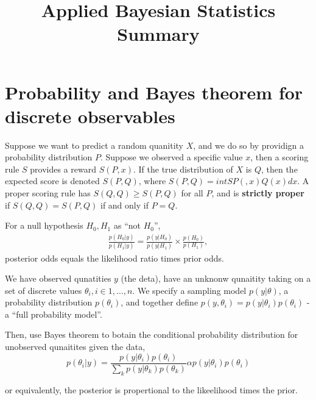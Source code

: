 

\title{Applied Bayesian Statistics Summary}



\maketitle

\section{Probability and Bayes theorem for discrete observables}
\label{sec:prob-bayes-theorobservables}

\begin{defn}
  \label{sec:prob-bayes-theor-1}
  Suppose we want to predict a random quanitity $X$, and we do so by
  providign a probability distribution $P$.  Suppose we observed a
  specific value $x$, then a scoring rule $S$ provides a reward $S(P,
  x)$.  If the true distribution of $X$ is $Q$, then the expected
  score is denoted $S(P, Q)$, where $S(P, Q) = int SP(, x) Q(x) dx$.
  A proper scoring rule has $S(Q, Q) \geq S(P, Q)$ for all $P$, and is
  \textbf{strictly proper} if $S(Q, Q) = S(P, Q)$ if and only if $P = Q.$
\end{defn}

\begin{thm}
  \label{sec:prob-bayes-theor-2}
  For a null hypothesis $H_{0}, H_{1}$ as ``not $H_{0}$'',
  \begin{align}
    \label{eq:1}
    \frac{p(H_{0} | y)}{p(H_{1} | y)}  = \frac{p(y | H_{0})}{p(y |
      H_{1})} \times \frac{p(H_{0})}{p(H_{1})},
  \end{align}
  posterior odds equals the likelihood ratio times prior odds.
\end{thm}

\begin{defn}
  \label{sec:prob-bayes-theor-3}
  We have observed qunatities $y$ (the deta), have an unknonw
  qunaitity taking on a set of discrete values $\theta_{i}, i \in 1,
  \dots, n$.  We specify a sampling model $p(y | \theta)$, a
  probability distribution $p(\theta_{i})$, and together define $p(y,
  \theta_{i}) = p(y | \theta_{i}) p(\theta_{i})$ - a ``full
  probability model''.

  Then, use Bayes theorem to botain the conditional probability
  distribution for unobserved qunaitites given the data,
  \begin{equation}
    \label{eq:2}
    p(\theta_{i} | y) = \frac{p(y | \theta_{i})
      p(\theta_{i})}{\sum_{k}^{} p(y | \theta_{k}) p(\theta_{k})}
    \alpha p(y | \theta_{i}) p(\theta_{i})
  \end{equation}

  or equivalently, the posterior is propertional to the likeelihood
  times the prior.
\end{defn}


